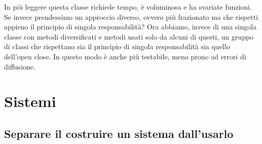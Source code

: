 \documentclass[11pt,a4paper]{book}
\begin{document}
In più leggere questa classe richiede tempo, è voluminosa e ha svariate funzioni. Se invece prendessimo un approccio diverso, ovvero più frazionato ma che rispetti appieno il principio di singola responsabilità?
\label{code: 058}
Ora abbiamo, invece di una singola classe con metodi diversificati e metodi usati solo da alcuni di questi, un gruppo di classi che rispettano sia il principio di singola responsabilità sia quello dell'open close. In questo modo è anche più testabile, meno prono ad errori di diffusione.

\chapter{Sistemi}
\section{Separare il costruire un sistema dall'usarlo}
\end{document}
